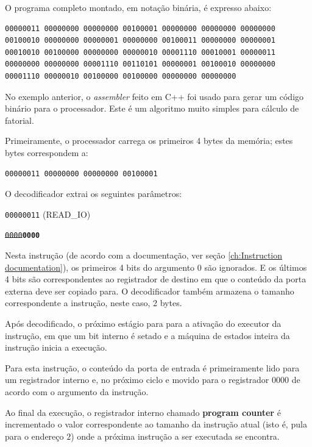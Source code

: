\documentclass[11pt]{report}
\begin{document}
O programa completo montado, em notação binária, é expresso abaixo:

\begin{lstlisting}[breakatwhitespace=true,breakindent=0em,breaklines=true]
00000011 00000000 00000000 00100001 00000000 00000000 00000000 00100010 00000000 00000001 00000000 00100011 00000000 00000001 00010010 00100000 00000000 00000010 00001110 00010001 00000011 00000000 00000000 00001110 00110101 00000001 00100010 00000000 00001110 00000010 00100000 00100000 00000000 00000000 
\end{lstlisting}

No exemplo anterior, o \emph{assembler} feito em C++ foi usado para gerar um código binário para o processador. Este é um algoritmo muito simples para cálculo de fatorial.

Primeiramente, o processador carrega os primeiros 4 bytes da memória; estes bytes correspondem a:

\begin{lstlisting}
00000011 00000000 00000000 00100001
\end{lstlisting}

O decodificador extrai os seguintes parâmetros:
\begin{description}[style=multiline,topsep=10pt,leftmargin=5cm]
	\item[Opcode] \texttt{00000011} (READ\_IO)
	\item[Argumento 0] \texttt{\st{0000}\textbf{0000}}
\end{description}

Nesta instrução (de acordo com a documentação, ver seção \ref{ch:Instruction documentation}), os primeiros 4 bits do argumento 0 são ignorados. E os últimos 4 bits são correspondentes ao registrador de destino em que o conteúdo da porta externa deve ser copiado para. O decodificador também armazena o tamanho correspondente a instrução, neste caso, 2 bytes.

Após decodificado, o próximo estágio para para a ativação do executor da instrução, em que um bit interno é setado e a máquina de estados inteira da instrução inicia a execução.

Para esta instrução, o conteúdo da porta de entrada é primeiramente lido para um registrador interno e, no próximo ciclo e movido para o registrador 0000 de acordo com o argumento da instrução.

Ao final da execução, o registrador interno chamado \textbf{program counter} é incrementado o valor correspondente ao tamanho da instrução atual (isto é, pula para o endereço $2$) onde a próxima instrução a ser executada se encontra.
\end{document}
